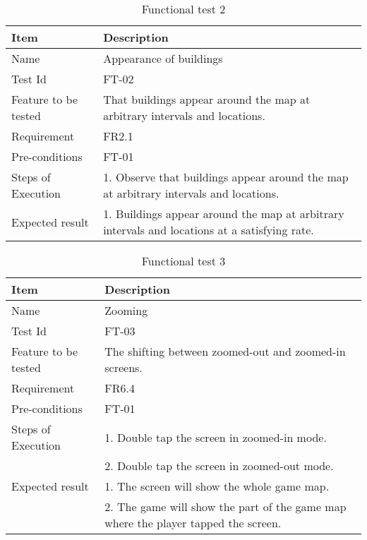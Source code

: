 \begin{table}[H]
\centering
	\begin{tabular}{ l | p{8cm} }
		\hline
		{\bf Item} & {\bf Description} \\ \hline
		Name & Appearance of buildings \\ 
		Test Id & FT-02 \\ 
		Feature to be tested & That buildings appear around the map at arbitrary intervals and locations. \\ 
		Requirement & FR2.1 \\ 
		Pre-conditions & FT-01 \\ 
		Steps of Execution & 1. Observe that buildings appear around the map at arbitrary intervals and locations.\\ 
		Expected result & 1. Buildings appear around the map at arbitrary intervals and locations at a satisfying rate.\\ 
	\end{tabular}
	\caption{Functional test 2}
\end{table}

\begin{table}[H]
\centering
	\begin{tabular}{ l | p{8cm} }
		\hline
		{\bf Item} & {\bf Description} \\ \hline
		Name & Zooming \\ 
		Test Id & FT-03 \\ 
		Feature to be tested & The shifting between zoomed-out and zoomed-in screens. \\ 
		Requirement & FR6.4 \\ 
		Pre-conditions & FT-01 \\ 
		Steps of Execution & 1. Double tap the screen in zoomed-in mode.\\ 
		& 2. Double tap the screen in zoomed-out mode. \\
		Expected result & 1. The screen will show the whole game map. \\
		& 2. The game will show the part of the game map where the player tapped the screen. \\
	\end{tabular}
	\caption{Functional test 3}
\end{table}

